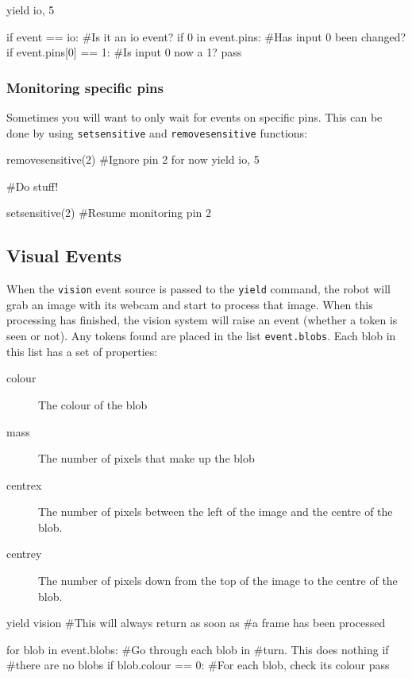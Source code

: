 \documentclass[a4paper, 12pt]{article}
\begin{document}
\begin{verbatimtab}
yield io, 5

if event == io:                #Is it an io event?
    if 0 in event.pins:        #Has input 0 been changed?
        if event.pins[0] == 1: #Is input 0 now a 1?
            pass
\end{verbatimtab}

\subsubsection{Monitoring specific pins}
Sometimes you will want to only wait for events on specific pins.  This can be
done by using \texttt{setsensitive} and \texttt{removesensitive} functions:

\begin{verbatimtab}

removesensitive(2) #Ignore pin 2 for now
yield io, 5

#Do stuff!

setsensitive(2) #Resume monitoring pin 2
\end{verbatimtab}

\subsection{Visual Events}
When the \texttt{vision} event source is passed to the \texttt{yield}
command, the robot will grab an image with its webcam and start to
process that image.  When this processing has finished, the vision
system will raise an event (whether a token is seen or not).  Any
tokens found are placed in the list \texttt{event.blobs}.  Each blob in this
list has a set of properties:  
\begin{description}
\item[colour] The colour of the blob
\item[mass] The number of pixels that make up the blob
\item[centrex] The number of pixels between the left of the image and
  the centre of the blob.
\item[centrey] The number of pixels down from the top of the image to the
  centre of the blob.
\end{description}

\begin{verbatimtab}
yield vision    #This will always return as soon as
                #a frame has been processed

for blob in event.blobs:    #Go through each blob in 
                            #turn. This does nothing if
                            #there are no blobs
    if blob.colour == 0:    #For each blob, check its colour
        pass
\end{verbatimtab}
\end{document}
